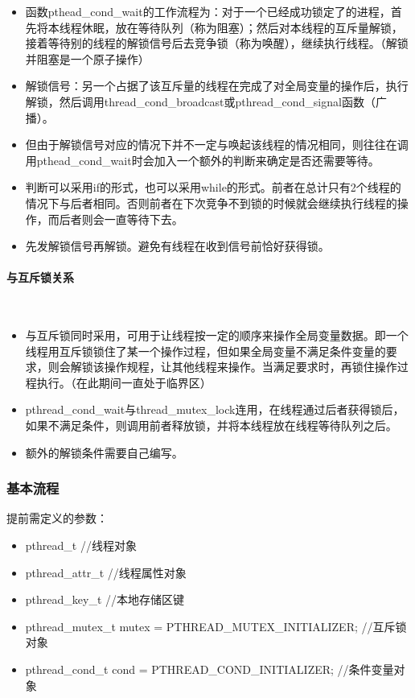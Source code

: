 \documentclass[UTF8]{article}%
\begin{document}
\begin{itemize}
    \item 函数pthead\_cond\_wait的工作流程为：对于一个已经成功锁定了的进程，首先将本线程休眠，放在等待队列（称为阻塞）；然后对本线程的互斥量解锁，接着等待别的线程的解锁信号后去竞争锁（称为唤醒），继续执行线程。（解锁并阻塞是一个原子操作）
    \item 解锁信号：另一个占据了该互斥量的线程在完成了对全局变量的操作后，执行解锁，然后调用thread\_cond\_broadcast或pthread\_cond\_signal函数（广播）。
    \item 但由于解锁信号对应的情况下并不一定与唤起该线程的情况相同，则往往在调用pthead\_cond\_wait时会加入一个额外的判断来确定是否还需要等待。
    \item 判断可以采用if的形式，也可以采用while的形式。前者在总计只有2个线程的情况下与后者相同。否则前者在下次竞争不到锁的时候就会继续执行线程的操作，而后者则会一直等待下去。
    \item 先发解锁信号再解锁。避免有线程在收到信号前恰好获得锁。
\end{itemize}

\paragraph{与互斥锁关系}~{}

\begin{itemize}
    \item 与互斥锁同时采用，可用于让线程按一定的顺序来操作全局变量数据。即一个线程用互斥锁锁住了某一个操作过程，但如果全局变量不满足条件变量的要求，则会解锁该操作规程，让其他线程来操作。当满足要求时，再锁住操作过程执行。（在此期间一直处于临界区）
    \item pthread\_cond\_wait与thread\_mutex\_lock连用，在线程通过后者获得锁后，如果不满足条件，则调用前者释放锁，并将本线程放在线程等待队列之后。
    \item 额外的解锁条件需要自己编写。
\end{itemize}

\subsubsection{基本流程}

提前需定义的参数：

\begin{itemize}
    \item pthread\_t  //线程对象
    \item pthread\_attr\_t  //线程属性对象
    \item pthread\_key\_t  //本地存储区键
    \item pthread\_mutex\_t mutex = PTHREAD\_MUTEX\_INITIALIZER;  //互斥锁对象
    \item pthread\_cond\_t  cond  = PTHREAD\_COND\_INITIALIZER;  //条件变量对象
\end{itemize}
\end{document}
